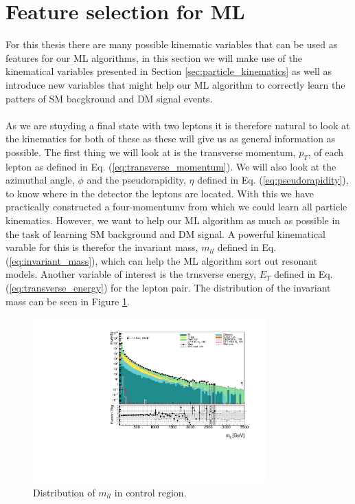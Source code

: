 \documentclass[12pt, a4paper]{book}
\begin{document}
\section{Feature selection for ML}
For this thesis there are many possible kinematic variables that can be used as features for our ML algorithms, in this section we will make use of the kinematical variables presented in Section \ref{sec:particle_kinematics} as well as introduce new variables that 
might help our ML algorithm to correctly learn the patters of SM bacgkround and DM signal events. \\
\\As we are stuyding a final state with two leptons it is therefore natural to look at the kinematics for both of these as these will give us as general information as possible. The first thing we will look at is the transverse momentum, $p_T$, of each lepton as defined in Eq. (\ref{eq:transverse_momentum}). 
We will also look at the azimuthal angle, $\phi$ and the pseudorapidity, $\eta$ defined in Eq. (\ref{eq:pseudorapidity}), to know where in the detector the leptons are located. 
With this we have practically constructed a four-momentumv from which we could learn all particle kinematics. However, we want to help our ML algorithm as much as possible in the task of learning SM background and DM signal. A powerful kinematical varable for this is 
therefor the invariant mass, $m_{ll}$ defined in Eq. (\ref{eq:invariant_mass}), which can help the ML algorithm sort out resonant models. Another variable of interest is the trnsverse energy, $E_T$ defined in Eq. (\ref{eq:transverse_energy}) for the lepton pair. 
The distribution of the invariant mass can be seen in Figure \ref{fig:mll_dist}.
\graphicspath{{../../../Plots/Data_Analysis/SRs/Control_region/}} 
\begin{figure}[!ht]
    \centering
        \includegraphics[width=0.8\textwidth]{mll.pdf}
    \caption{Distribution of $m_{ll}$ in control region.}\label{fig:mll_dist}
\end{figure}
\end{document}
